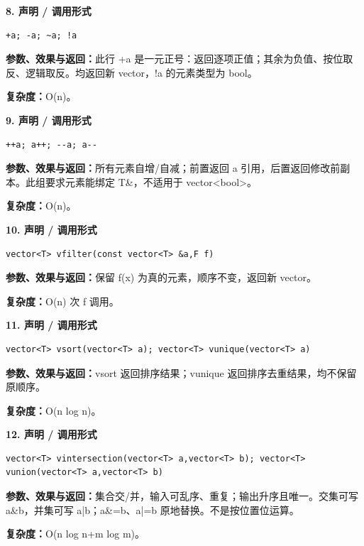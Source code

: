 \documentclass[UTF8,a4paper,10pt]{ctexart}
\begin{document}
\noindent\begin{minipage}{\textwidth}
\textbf{8. 声明 / 调用形式}
\begin{lstlisting}
+a; -a; ~a; !a
\end{lstlisting}
\textbf{参数、效果与返回：}此行 +a 是一元正号：返回逐项正值；其余为负值、按位取反、逻辑取反。均返回新 vector，!a 的元素类型为 bool。

\textbf{复杂度：}O(n)。

\end{minipage}\par\vspace{0.4em}
\noindent\begin{minipage}{\textwidth}
\textbf{9. 声明 / 调用形式}
\begin{lstlisting}
++a; a++; --a; a--
\end{lstlisting}
\textbf{参数、效果与返回：}所有元素自增/自减；前置返回 a 引用，后置返回修改前副本。此组要求元素能绑定 T\&，不适用于 vector<bool>。

\textbf{复杂度：}O(n)。

\end{minipage}\par\vspace{0.4em}
\noindent\begin{minipage}{\textwidth}
\textbf{10. 声明 / 调用形式}
\begin{lstlisting}
vector<T> vfilter(const vector<T> &a,F f)
\end{lstlisting}
\textbf{参数、效果与返回：}保留 f(x) 为真的元素，顺序不变，返回新 vector。

\textbf{复杂度：}O(n) 次 f 调用。

\end{minipage}\par\vspace{0.4em}
\noindent\begin{minipage}{\textwidth}
\textbf{11. 声明 / 调用形式}
\begin{lstlisting}
vector<T> vsort(vector<T> a); vector<T> vunique(vector<T> a)
\end{lstlisting}
\textbf{参数、效果与返回：}vsort 返回排序结果；vunique 返回排序去重结果，均不保留原顺序。

\textbf{复杂度：}O(n log n)。

\end{minipage}\par\vspace{0.4em}
\noindent\begin{minipage}{\textwidth}
\textbf{12. 声明 / 调用形式}
\begin{lstlisting}
vector<T> vintersection(vector<T> a,vector<T> b); vector<T> vunion(vector<T> a,vector<T> b)
\end{lstlisting}
\textbf{参数、效果与返回：}集合交/并，输入可乱序、重复；输出升序且唯一。交集可写 a\&b，并集可写 a|b；a\&=b、a|=b 原地替换。不是按位置位运算。

\textbf{复杂度：}O(n log n+m log m)。

\end{minipage}\par\vspace{0.4em}
\end{document}
